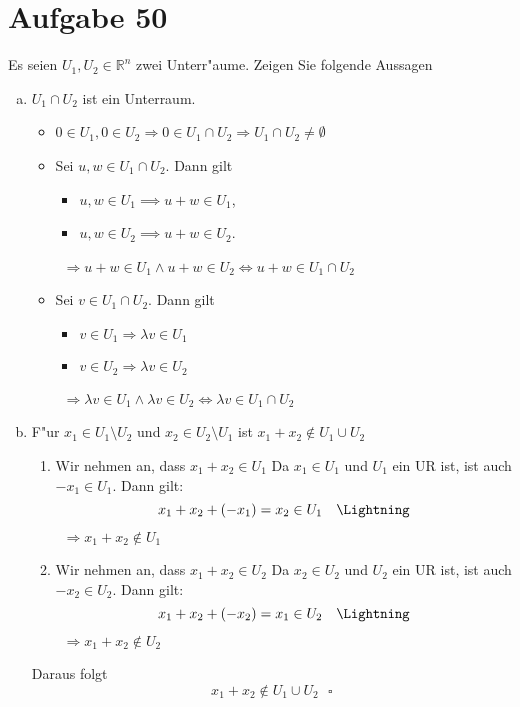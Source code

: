 \section{Aufgabe 50}

Es seien $U_1, U_2 \in \mathbb{R}^n$ zwei Unterr"aume. Zeigen Sie folgende Aussagen
\begin{enumerate}[(a)]
    \item $U_1 \cap U_2$ ist ein Unterraum.

        \begin{itemize}
            \item $0 \in U_1, 0 \in U_2 \Rightarrow 0 \in U_1 \cap U_2 \Rightarrow U_1 \cap U_2 \neq \emptyset$ \ \ \ \done
            \item Sei $u, w \in U_1 \cap U_2$. Dann gilt
                \begin{itemize}
                    \item $u, w \in U_1 \implies u + w \in U_1$,
                    \item $u, w \in U_2 \implies u + w \in U_2$.
                \end{itemize}
                \ $\Rightarrow u + w \in U_1 \land u + w \in U_2 \iff u + w \in U_1 \cap U_2$ \ \ \ \done
            \item Sei $v \in U_1 \cap U_2$. Dann gilt
                \begin{itemize}
                    \item $v \in U_1 \Rightarrow \lambda v \in U_1$
                    \item $v \in U_2 \Rightarrow \lambda v \in U_2$
                \end{itemize}
                \ $\Rightarrow \lambda v \in U_1 \land \lambda v \in U_2 \iff \lambda v \in U_1 \cap U_2$ \ \ \ \done
        \end{itemize}


    \item F"ur $x_1 \in U_1 \setminus U_2$ und $x_2 \in U_2 \setminus U_1$ ist $x_1 + x_2 \notin U_1 \cup U_2$

        \begin{enumerate}[1.]
            \item  Wir nehmen an, dass $x_1 + x_2 \in U_1$
                Da $x_1 \in U_1$ und $U_1$ ein UR ist, ist auch $-x_1 \in U_1$. Dann gilt:
                \begin{equation*}
                    x_1 + x_2 + (-x_1) = x_2 \in U_1 \ \ \ \text{\Lightning}
                \end{equation*}
                \ $\Rightarrow x_1 + x_2 \notin U_1$
            \item Wir nehmen an, dass $x_1 + x_2 \in U_2$
                Da $x_2 \in U_2$ und $U_2$ ein UR ist, ist auch $-x_2 \in U_2$. Dann gilt:
                \begin{equation*}
                    x_1 + x_2 + (-x_2) = x_1 \in U_2 \ \ \ \text{\Lightning}
                \end{equation*}
                \ $\Rightarrow x_1 + x_2 \notin U_2$
        \end{enumerate}

        Daraus folgt
        \begin{equation*}
            x_1 + x_2 \notin U_1 \cup U_2 \ \ \ \square
        \end{equation*}
\end{enumerate}
